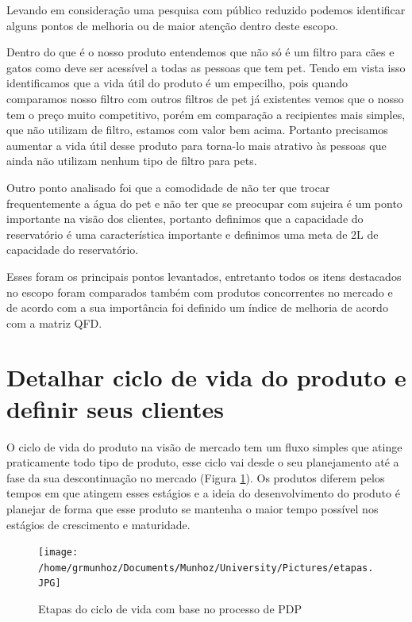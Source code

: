 \documentclass[
	12pt,				%
	openright,			%
	oneside,			%
	a4paper,			%
	english,			%
	french,				%
	spanish,			%
	brazil				%
	]{abntex2}
\begin{document}
Levando em consideração uma pesquisa com público reduzido podemos identificar alguns pontos de melhoria ou de maior atenção dentro deste escopo. 

Dentro do que é o nosso produto entendemos que não só é um filtro para cães e gatos como deve ser acessível a todas as pessoas que tem pet. Tendo em vista isso identificamos que a vida útil do produto é um empecilho, pois quando comparamos nosso filtro com outros filtros de pet já existentes vemos que o nosso tem o preço muito competitivo, porém em comparação a recipientes mais simples, que não utilizam de filtro, estamos com valor bem acima. Portanto precisamos aumentar a vida útil desse produto para torna-lo mais atrativo às pessoas que ainda não utilizam nenhum tipo de filtro para pets.

Outro ponto analisado foi que a comodidade de não ter que trocar frequentemente a água do pet e não ter que se preocupar com sujeira é um ponto importante na visão dos clientes, portanto definimos que a capacidade do reservatório é uma característica importante e definimos uma meta de 2L de capacidade do reservatório.

Esses foram os principais pontos levantados, entretanto todos os itens destacados no escopo foram comparados também com produtos concorrentes no mercado e de acordo com a sua importância foi definido um índice de melhoria de acordo com a matriz QFD.


\section{Detalhar ciclo de vida do produto e definir seus clientes}

O ciclo de vida do produto na visão de mercado tem um fluxo simples que atinge praticamente todo tipo de produto, esse ciclo vai desde o seu planejamento até a fase da sua descontinuação no mercado (Figura \ref{figetapas}). Os produtos diferem pelos tempos em que atingem esses estágios e a ideia do desenvolvimento do produto é planejar de forma que esse produto se mantenha o maior tempo possível nos estágios de crescimento e maturidade.

\begin{figure}[H]
\begin{center}
\caption{Etapas do ciclo de vida com base no processo de PDP}
\texttt{[image: /home/grmunhoz/Documents/Munhoz/University/Pictures/etapas.JPG]} 
\label{figetapas}
\end{center}
\end{figure}
\end{document}
